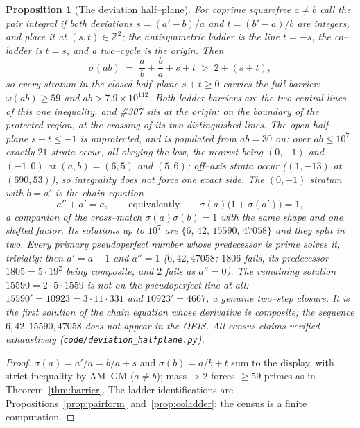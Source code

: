 \documentclass[11pt]{article}
\newtheorem{proposition}[theorem]{Proposition}
\theoremstyle{definition}
\begin{document}
\begin{proposition}[The deviation half--plane]\label{prop:halfplane}
For coprime squarefree $a\neq b$ call the pair \emph{integral} if both deviations
$s=(a'-b)/a$ and $t=(b'-a)/b$ are integers, and place it at $(s,t)\in\mathbb{Z}^2$; the
antisymmetric ladder is the line $t=-s$, the co--ladder is $t=s$, and a two--cycle is the origin.
Then
\[ \sigma(ab)\;=\;\frac ab+\frac ba+s+t\;>\;2+(s+t), \]
so \emph{every} stratum in the closed half--plane $s+t\ge0$ carries the full barrier:
$\omega(ab)\ge59$ and $ab>7.9\times10^{112}$. Both ladder barriers are the two central lines of
this one inequality, and \#307 sits at the origin; on the boundary of the protected region, at
the crossing of its two distinguished lines. The open half--plane $s+t\le-1$ is unprotected, and is
populated from $ab=30$ on: over $ab\le10^7$ exactly $21$ strata occur, all obeying the law, the
nearest being $(0,-1)$ and $(-1,0)$ at $(a,b)=(6,5)$ and $(5,6)$; off--axis strata occur
($(1,-13)$ at $(690,53)$), so integrality does not force one exact side. The $(0,-1)$ stratum with
$b=a'$ is the chain equation
\[ a''+a'=a,\qquad\text{equivalently}\qquad \sigma(a)\bigl(1+\sigma(a')\bigr)=1, \]
a companion of the cross--match $\sigma(a)\sigma(b)=1$ with the same shape and one shifted factor.
Its solutions up to $10^7$ are $\{6,\,42,\,15590,\,47058\}$ and they split in two. Every primary
pseudoperfect number whose predecessor is \emph{prime} solves it, trivially: then $a'=a-1$ and
$a''=1$ ($6,42,47058$; $1806$ fails, its predecessor $1805=5\cdot19^2$ being composite, and $2$
fails as $a''=0$). The remaining solution $15590=2\cdot5\cdot1559$ is not on the pseudoperfect line
at all: $15590'=10923=3\cdot11\cdot331$ and $10923'=4667$, a genuine two--step closure. It is the
first solution of the chain equation whose derivative is composite; the sequence
$6,42,15590,47058$ does not appear in the OEIS. All census claims verified exhaustively
(\texttt{code/deviation\_halfplane.py}).
\end{proposition}
\begin{proof}
$\sigma(a)=a'/a=b/a+s$ and $\sigma(b)=a/b+t$ sum to the display, with strict inequality by AM--GM
($a\neq b$); mass $>2$ forces $\ge59$ primes as in Theorem~\ref{thm:barrier}. The ladder
identifications are Propositions~\ref{prop:pairform} and~\ref{prop:coladder}; the census is a
finite computation.
\end{proof}
\end{document}
